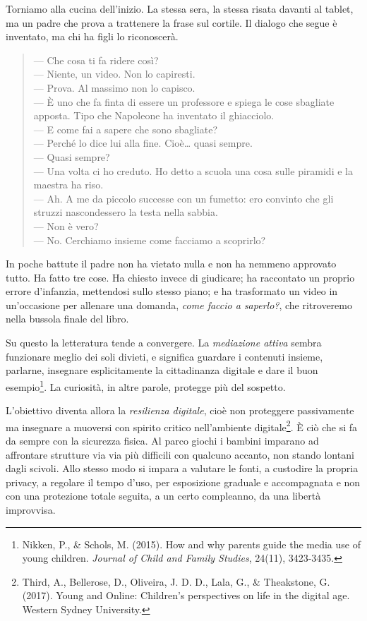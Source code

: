 Torniamo alla cucina dell'inizio. La stessa sera, la stessa risata davanti al tablet, ma un padre che prova a trattenere la frase sul cortile. Il dialogo che segue è inventato, ma chi ha figli lo riconoscerà.

\begin{quote}
\small
— Che cosa ti fa ridere così?\\
— Niente, un video. Non lo capiresti.\\
— Prova. Al massimo non lo capisco.\\
— È uno che fa finta di essere un professore e spiega le cose sbagliate apposta. Tipo che Napoleone ha inventato il ghiacciolo.\\
— E come fai a sapere che sono sbagliate?\\
— Perché lo dice lui alla fine. Cioè… quasi sempre.\\
— Quasi sempre?\\
— Una volta ci ho creduto. Ho detto a scuola una cosa sulle piramidi e la maestra ha riso.\\
— Ah. A me da piccolo successe con un fumetto: ero convinto che gli struzzi nascondessero la testa nella sabbia.\\
— Non è vero?\\
— No. Cerchiamo insieme come facciamo a scoprirlo?
\end{quote}

\noindent In poche battute il padre non ha vietato nulla e non ha nemmeno approvato tutto. Ha fatto tre cose. Ha chiesto invece di giudicare; ha raccontato un proprio errore d'infanzia, mettendosi sullo stesso piano; e ha trasformato un video in un'occasione per allenare una domanda, \textit{come faccio a saperlo?}, che ritroveremo nella bussola finale del libro.


Su questo la letteratura tende a convergere. La \textit{mediazione attiva} sembra funzionare meglio dei soli divieti, e significa guardare i contenuti insieme, parlarne, insegnare esplicitamente la cittadinanza digitale e dare il buon esempio\footnote{Nikken, P., \& Schols, M. (2015). How and why parents guide the media use of young children. \textit{Journal of Child and Family Studies}, 24(11), 3423-3435.}. La curiosità, in altre parole, protegge più del sospetto.

L'obiettivo diventa allora la \textit{resilienza digitale}, cioè non proteggere passivamente ma insegnare a muoversi con spirito critico nell'ambiente digitale\footnote{Third, A., Bellerose, D., Oliveira, J. D. D., Lala, G., \& Theakstone, G. (2017). Young and Online: Children's perspectives on life in the digital age. Western Sydney University.}. È ciò che si fa da sempre con la sicurezza fisica. Al parco giochi i bambini imparano ad affrontare strutture via via più difficili con qualcuno accanto, non stando lontani dagli scivoli. Allo stesso modo si impara a valutare le fonti, a custodire la propria privacy, a regolare il tempo d'uso, per esposizione graduale e accompagnata e non con una protezione totale seguita, a un certo compleanno, da una libertà improvvisa.

